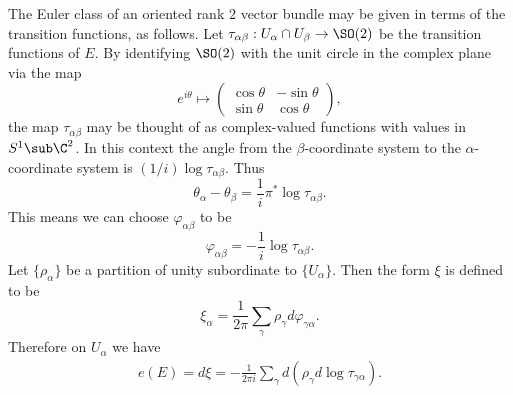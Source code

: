 The Euler class of an oriented rank $2$ vector bundle may be given in terms of the transition functions, as follows. Let 
$\tau_{\alpha\beta}:U_\alpha\cap U_\beta\to\SO(2)$ be the transition functions of $E$. By identifying $\SO(2)$ with the unit circle in the complex plane via the map 
\[e^{i\theta}\mapsto\begin{pmatrix}
\cos\theta&-\sin\theta\\
\sin\theta&\cos\theta
\end{pmatrix},\]
the map $\tau_{\alpha\beta}$ may be thought of as complex-valued functions with values in $S^1\sub\C^2$. In this context the angle from the $\beta$-coordinate system 
to the $\alpha$-coordinate system is $(1/i)\log\tau_{\alpha\beta}$. Thus
\[\theta_\alpha-\theta_\beta=\frac{1}{i}\pi^*\log\tau_{\alpha\beta}.\]
This means we can choose $\varphi_{\alpha\beta}$ to be
\[\varphi_{\alpha\beta}=-\frac{1}{i}\log\tau_{\alpha\beta}.\]
Let $\{\rho_\alpha\}$ be a partition of unity subordinate to $\{U_\alpha\}$. Then the form $\xi$ is defined to be
\[\xi_\alpha=\frac{1}{2\pi}\sum_{\gamma}\rho_\gamma d\varphi_{\gamma\alpha}.\]
Therefore on $U_\alpha$ we have
\begin{align}\label{Euler class rank 2 transition}
e(E)=d\xi=-\frac{1}{2\pi i}\sum_{\gamma}d(\rho_\gamma d\log\tau_{\gamma\alpha}).
\end{align}
